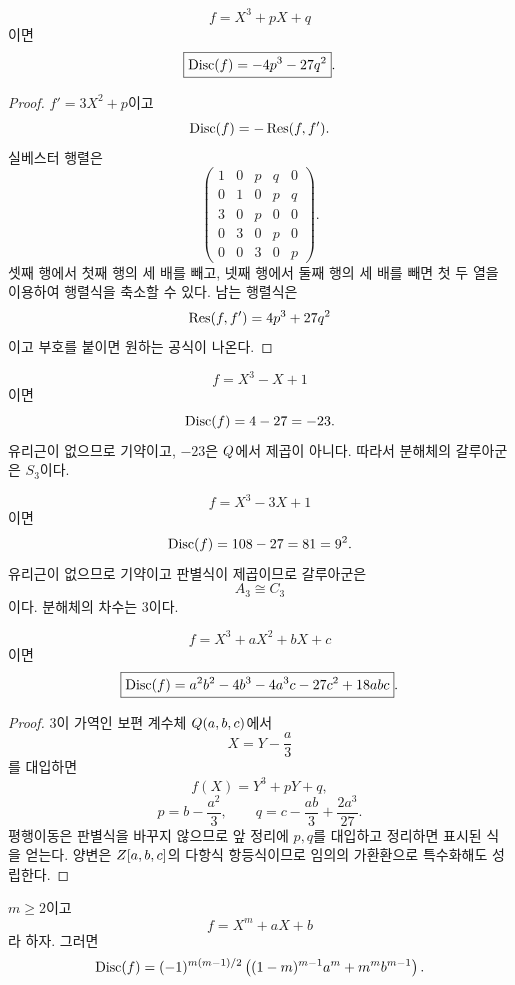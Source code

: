 \begin{theorem}
\label{thm:depressed-cubic-discriminant}
\[
  f=X^3+pX+q
\]
이면
\[
  \boxed{\operatorname{Disc}(f)=-4p^3-27q^2}.
\]
\end{theorem}

\begin{proof}
$f'=3X^2+p$이고
\[
  \operatorname{Disc}(f)=-\operatorname{Res}(f,f').
\]
실베스터 행렬은
\[
  \begin{pmatrix}
  1&0&p&q&0\\
  0&1&0&p&q\\
  3&0&p&0&0\\
  0&3&0&p&0\\
  0&0&3&0&p
  \end{pmatrix}.
\]
셋째 행에서 첫째 행의 세 배를 빼고, 넷째 행에서 둘째 행의 세 배를 빼면 첫 두 열을 이용하여 행렬식을 축소할 수 있다. 남는 행렬식은
\[
  \operatorname{Res}(f,f')=4p^3+27q^2
\]
이고 부호를 붙이면 원하는 공식이 나온다.
\end{proof}

\begin{example}
\[
  f=X^3-X+1
\]
이면
\[
  \operatorname{Disc}(f)=4-27=-23.
\]
유리근이 없으므로 기약이고, $-23$은 $Q$에서 제곱이 아니다. 따라서 분해체의 갈루아군은 $S_3$이다.
\end{example}

\begin{example}
\[
  f=X^3-3X+1
\]
이면
\[
  \operatorname{Disc}(f)=108-27=81=9^2.
\]
유리근이 없으므로 기약이고 판별식이 제곱이므로 갈루아군은
\[
  A_3\cong C_3
\]
이다. 분해체의 차수는 $3$이다.
\end{example}

\begin{theorem}[일반 삼차식]
\label{thm:general-cubic-discriminant}
\[
  f=X^3+aX^2+bX+c
\]
이면
\[
  \boxed{
  \operatorname{Disc}(f)
  =a^2b^2-4b^3-4a^3c-27c^2+18abc
  }.
\]
\end{theorem}

\begin{proof}
$3$이 가역인 보편 계수체 $Q(a,b,c)$에서
\[
  X=Y-\frac a3
\]
를 대입하면
\[
  f(X)=Y^3+pY+q,
\]
\[
  p=b-\frac{a^2}{3},
  \qquad
  q=c-\frac{ab}{3}+\frac{2a^3}{27}.
\]
평행이동은 판별식을 바꾸지 않으므로 앞 정리에 $p,q$를 대입하고 정리하면 표시된 식을 얻는다. 양변은 $Z[a,b,c]$의 다항식 항등식이므로 임의의 가환환으로 특수화해도 성립한다.
\end{proof}

\begin{theorem}
$m\ge2$이고
\[
  f=X^m+aX+b
\]
라 하자. 그러면
\[
  \operatorname{Disc}(f)
  =(-1)^{m(m-1)/2}
  \left((1-m)^{m-1}a^m+m^m b^{m-1}\right).
\]
\end{theorem}

